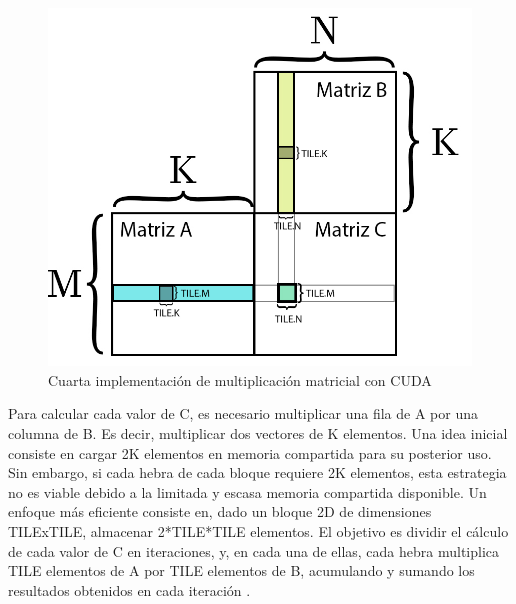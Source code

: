\begin{figure}[H]
	\centering
	\includegraphics[scale=0.3]{imagenes/gemm_tile_v4.jpg}  
	\caption{Cuarta implementación de multiplicación matricial con CUDA}
	\label{fig:mult_matrix_cuda_v4}
\end{figure}

Para calcular cada valor de C, es necesario multiplicar una fila de A por una columna de B. Es decir, multiplicar dos vectores de K elementos. Una idea inicial consiste en cargar 2K elementos en memoria compartida para su posterior uso. Sin embargo, si cada hebra de cada bloque requiere 2K elementos, esta estrategia no es viable debido a la limitada y escasa memoria compartida disponible. Un enfoque más eficiente consiste en, dado un bloque 2D de dimensiones TILExTILE, almacenar 2*TILE*TILE elementos. El objetivo es dividir el cálculo de cada valor de C en iteraciones, y, en cada una de ellas, cada hebra multiplica TILE elementos de A por TILE elementos de B, acumulando y sumando los resultados obtenidos en cada iteración \cite{nvidia_mult_matrix_v4}. \\
